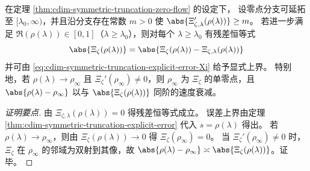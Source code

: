 \begin{corollary}\label{cor:cdim-symmetric-truncation-zero-branch-residual-certificate}
在定理 \ref{thm:cdim-symmetric-truncation-zero-flow} 的设定下，
设零点分支可延拓至 \([\lambda_0,\infty)\)，并且沿分支存在常数 \(m>0\) 使
\(
\abs{\Xi_{\zeta,\lambda}'(\rho(\lambda))}\ge m
\)。
若进一步满足 \(\Re(\rho(\lambda))\in[0,1]\)（\(\lambda\ge \lambda_0\)），则对每个 \(\lambda\ge \lambda_0\) 有残差恒等式
\[
\abs{\Xi_\zeta(\rho(\lambda))}
=\abs{\Xi_\zeta(\rho(\lambda))-\Xi_{\zeta,\lambda}(\rho(\lambda))}
\]
并可由 \eqref{eq:cdim-symmetric-truncation-explicit-error-Xi} 给予显式上界。
特别地，若 \(\rho(\lambda)\to\rho_\infty\) 且 \(\Xi_\zeta'(\rho_\infty)\neq 0\)，则 \(\rho_\infty\) 为 \(\Xi_\zeta\) 的单零点，且
\(
\abs{\rho(\lambda)-\rho_\infty}
\)
以与 \(\abs{\Xi_\zeta(\rho(\lambda))}\) 同阶的速度衰减。
\end{corollary}
\begin{proof}[证明要点]
由 \(\Xi_{\zeta,\lambda}(\rho(\lambda))=0\) 得残差恒等式成立。
误差上界由定理 \ref{thm:cdim-symmetric-truncation-explicit-error} 代入 \(s=\rho(\lambda)\) 得出。
若 \(\rho(\lambda)\to\rho_\infty\)，则由 \(\Xi_\zeta(\rho(\lambda))\to 0\) 得 \(\Xi_\zeta(\rho_\infty)=0\)。
当 \(\Xi_\zeta'(\rho_\infty)\neq 0\) 时，\(\Xi_\zeta\) 在 \(\rho_\infty\) 的邻域为双射到其像，故 \(\abs{\rho(\lambda)-\rho_\infty}\asymp \abs{\Xi_\zeta(\rho(\lambda))}\)。证毕。
\end{proof}

